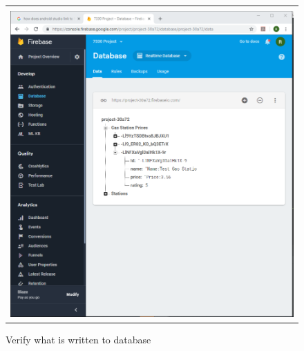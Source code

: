 \documentclass[conference]{IEEEtran}
\begin{document}
\begin{figure}[h] %
\begin{tabular}{| p{}|}
\hline
\\
\begin{center} \includegraphics[scale=.4]{../graphics/Step6.png} \end{center}\\
\hline
\end{tabular}	
	\caption{Verify what is written to database}
	\label{fig:Step6}
\end{figure} 
\end{document}
